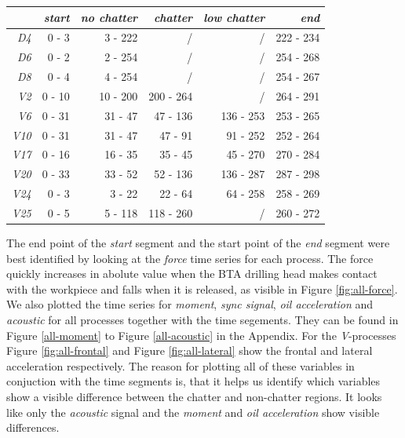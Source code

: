 \documentclass[12 pt]{scrartcl}
\begin{document}
\begin{table}[ht]
  \centering
  \label{tab:segmenttime}
  \begin{tabular}{r|rrrrr}
               & \emph{start} & \emph{no chatter} & \emph{chatter} & \emph{low chatter} & \emph{end} \\
    \hline
    \emph{D4}  & 0 - 3        & 3  - 222          & /              & /                  & 222 - 234  \\
    \emph{D6}  & 0 - 2        & 2  - 254          & /              & /                  & 254 - 268  \\
    \emph{D8}  & 0 - 4        & 4  - 254          & /              & /                  & 254 - 267  \\
    \emph{V2}  & 0 - 10       & 10 - 200          & 200 - 264      & /                  & 264 - 291  \\
    \emph{V6}  & 0 - 31       & 31 - 47           & 47  - 136      & 136 - 253          & 253 - 265  \\
    \emph{V10} & 0 - 31       & 31 - 47           & 47  - 91       & 91  - 252          & 252 - 264  \\
    \emph{V17} & 0 - 16       & 16 - 35           & 35  - 45       & 45  - 270          & 270 - 284  \\
    \emph{V20} & 0 - 33       & 33 - 52           & 52  - 136      & 136 - 287          & 287 - 298  \\
    \emph{V24} & 0 - 3        & 3  - 22           & 22  - 64       & 64  - 258          & 258 - 269  \\
    \emph{V25} & 0 - 5        & 5  - 118          & 118 - 260      & /                  & 260 - 272  \\
  \end{tabular}
\end{table}

The end point of the \emph{start} segment and the start point of the \emph{end} segment were best identified by looking at the \emph{force} time series for each process. The force quickly increases in abolute value when the BTA drilling head makes contact with the workpiece and falls when it is released, as visible in Figure \ref{fig:all-force}.
We also plotted the time series for \emph{moment}, \emph{sync signal}, \emph{oil acceleration} and \emph{acoustic} for all processes together with the time segements. They can be found in Figure \ref{all-moment} to Figure \ref{all-acoustic} in the Appendix. For the \emph{V}-processes Figure \ref{fig:all-frontal} and Figure \ref{fig:all-lateral} show the frontal and lateral acceleration respectively. The reason for plotting all of these variables in conjuction with the time segments is, that it helps us identify which variables show a visible difference between the chatter and non-chatter regions. It looks like only the \emph{acoustic} signal and the \emph{moment} and \emph{oil acceleration} show visible differences.
\end{document}
